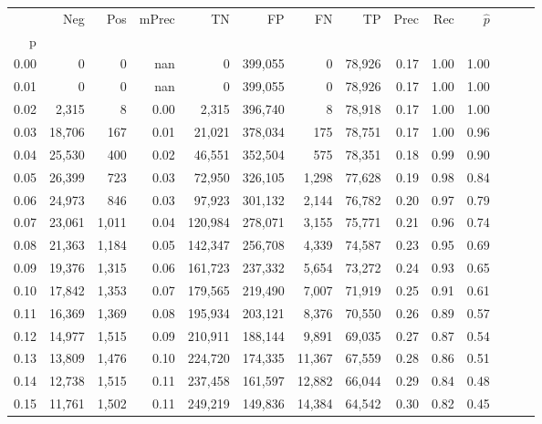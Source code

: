 \begin{tabular}{rrrrrrrrrrrrrr}
\toprule
{} &     Neg &    Pos & mPrec &       TN &       FP &      FN &      TP &  Prec &   Rec & $\hat{p}$ \\
p    &         &        &       &          &          &         &         &       &       &           \\
\midrule
0.00 &       0 &      0 &   nan &        0 &  399,055 &       0 &  78,926 &  0.17 &  1.00 &      1.00 \\
0.01 &       0 &      0 &   nan &        0 &  399,055 &       0 &  78,926 &  0.17 &  1.00 &      1.00 \\
0.02 &   2,315 &      8 &  0.00 &    2,315 &  396,740 &       8 &  78,918 &  0.17 &  1.00 &      1.00 \\
0.03 &  18,706 &    167 &  0.01 &   21,021 &  378,034 &     175 &  78,751 &  0.17 &  1.00 &      0.96 \\
0.04 &  25,530 &    400 &  0.02 &   46,551 &  352,504 &     575 &  78,351 &  0.18 &  0.99 &      0.90 \\
0.05 &  26,399 &    723 &  0.03 &   72,950 &  326,105 &   1,298 &  77,628 &  0.19 &  0.98 &      0.84 \\
0.06 &  24,973 &    846 &  0.03 &   97,923 &  301,132 &   2,144 &  76,782 &  0.20 &  0.97 &      0.79 \\
0.07 &  23,061 &  1,011 &  0.04 &  120,984 &  278,071 &   3,155 &  75,771 &  0.21 &  0.96 &      0.74 \\
0.08 &  21,363 &  1,184 &  0.05 &  142,347 &  256,708 &   4,339 &  74,587 &  0.23 &  0.95 &      0.69 \\
0.09 &  19,376 &  1,315 &  0.06 &  161,723 &  237,332 &   5,654 &  73,272 &  0.24 &  0.93 &      0.65 \\
0.10 &  17,842 &  1,353 &  0.07 &  179,565 &  219,490 &   7,007 &  71,919 &  0.25 &  0.91 &      0.61 \\
0.11 &  16,369 &  1,369 &  0.08 &  195,934 &  203,121 &   8,376 &  70,550 &  0.26 &  0.89 &      0.57 \\
0.12 &  14,977 &  1,515 &  0.09 &  210,911 &  188,144 &   9,891 &  69,035 &  0.27 &  0.87 &      0.54 \\
0.13 &  13,809 &  1,476 &  0.10 &  224,720 &  174,335 &  11,367 &  67,559 &  0.28 &  0.86 &      0.51 \\
0.14 &  12,738 &  1,515 &  0.11 &  237,458 &  161,597 &  12,882 &  66,044 &  0.29 &  0.84 &      0.48 \\
0.15 &  11,761 &  1,502 &  0.11 &  249,219 &  149,836 &  14,384 &  64,542 &  0.30 &  0.82 &      0.45 \\

\end{tabular}
